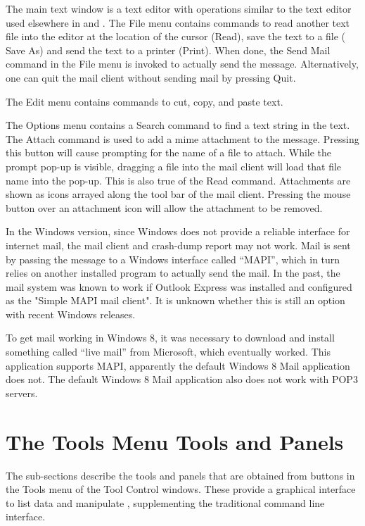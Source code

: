 The main text window is a text editor with operations similar to the
text editor used elsewhere in {\Xic} and {\WRspice}.  The {\cb File}
menu contains commands to read another text file into the editor at
the location of the cursor ({\cb Read}), save the text to a file ({\cb
Save As}) and send the text to a printer ({\cb Print}).  When done,
the {\cb Send Mail} command in the {\cb File} menu is invoked to
actually send the message.  Alternatively, one can quit the mail
client without sending mail by pressing {\cb Quit}.

The {\cb Edit} menu contains commands to cut, copy, and paste text.

The {\cb Options} menu contains a {\cb Search} command to find a text
string in the text.  The {\cb Attach} command is used to add a mime
attachment to the message.  Pressing this button will cause prompting
for the name of a file to attach.  While the prompt pop-up is visible,
dragging a file into the mail client will load that file name into the
pop-up.  This is also true of the {\cb Read} command.  Attachments are
shown as icons arrayed along the tool bar of the mail client. 
Pressing the mouse button over an attachment icon will allow the
attachment to be removed.

In the Windows version, since Windows does not provide a reliable
interface for internet mail, the mail client and crash-dump report may
not work.  Mail is sent by passing the message to a Windows interface
called ``MAPI'', which in turn relies on another installed program to
actually send the mail.  In the past, the mail system was known to
work if Outlook Express was installed and configured as the "Simple
MAPI mail client".  It is unknown whether this is still an option with
recent Windows releases.

To get mail working in Windows 8, it was necessary to download and
install something called ``{\vt live mail}'' from Microsoft, which
eventually worked.  This application supports MAPI, apparently the
default Windows 8 Mail application does not.  The default Windows 8
Mail application also does not work with POP3 servers.


\section{The Tools Menu Tools and Panels}

The sub-sections describe the tools and panels that are obtained from
buttons in the {\cb Tools} menu of the {\cb Tool Control} windows. 
These provide a graphical interface to list data and manipulate
{\WRspice}, supplementing the traditional command line interface.

